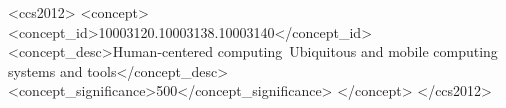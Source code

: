\documentclass[sigconf,authordraft]{acmart}
\begin{document}
\begin{CCSXML}
<ccs2012>
   <concept>
       <concept_id>10003120.10003138.10003140</concept_id>
       <concept_desc>Human-centered computing~Ubiquitous and mobile computing systems and tools</concept_desc>
       <concept_significance>500</concept_significance>
       </concept>
 </ccs2012>
\end{CCSXML}




\maketitle

\end{document}
